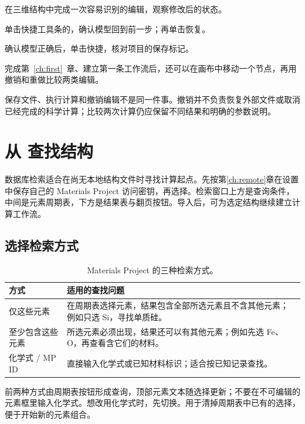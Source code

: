 \begin{steps}
\item 在三维结构中完成一次容易识别的编辑，观察修改后的状态。
\item 单击快捷工具条的，确认模型回到前一步；再单击恢复。
\item 确认模型正确后，单击快捷，核对项目的保存标记。
\end{steps}

完成第~\ref{ch:first}~章、建立第一条工作流后，还可以在画布中移动一个节点，再用撤销和重做比较两类编辑。

保存文件、执行计算和撤销编辑不是同一件事。撤销并不负责恢复外部文件或取消已经完成的科学计算；比较两次计算仍应保留不同结果和明确的参数说明。

\section{从  查找结构}\label{sec:mp-search}

数据库检索适合在尚无本地结构文件时寻找计算起点。先按第\ref{ch:remote}章在设置中保存自己的 Materials Project 访问密钥，再选择。检索窗口上方是查询条件，中间是元素周期表，下方是结果表与翻页按钮。导入后，可为选定结构继续建立计算工作流。

\subsection{选择检索方式}

\begin{table}[htbp]
\centering
\caption{Materials Project 的三种检索方式。}
\begin{tabularx}{\linewidth}{lX}
\toprule
方式 & 适用的查找问题 \\
\midrule
仅这些元素 & 在周期表选择元素，结果包含全部所选元素且不含其他元素；例如只选 Si，寻找单质硅。 \\
至少包含这些元素 & 所选元素必须出现，结果还可以有其他元素；例如先选 Fe、O，再查看含它们的材料。 \\
化学式 / MP ID & 直接输入化学式或已知材料标识；适合按已知记录查找。 \\
\bottomrule
\end{tabularx}
\end{table}

前两种方式由周期表按钮形成查询，顶部元素文本随选择更新；不要在不可编辑的元素框里输入化学式。想改用化学式时，先切换。用于清掉周期表中已有的选择，便于开始新的元素组合。

